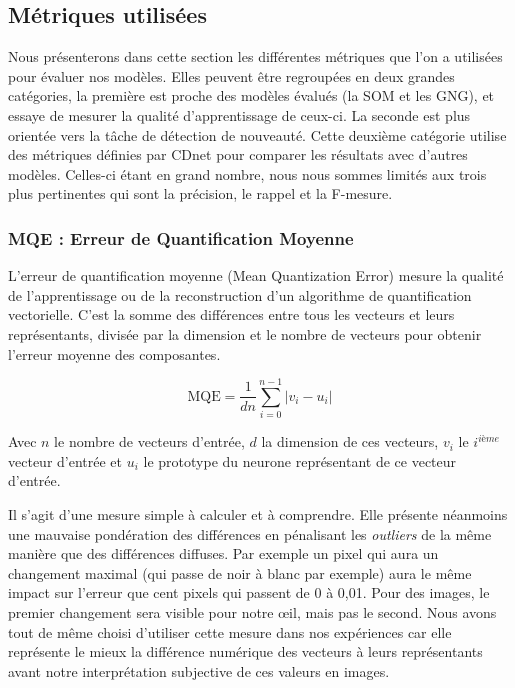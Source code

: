 	\subsection{Métriques utilisées}

	Nous présenterons dans cette section les différentes métriques que l'on a utilisées pour évaluer nos modèles. Elles peuvent être regroupées en deux grandes catégories, la première est proche des modèles évalués (la SOM et les GNG), et essaye de mesurer la qualité d'apprentissage de ceux-ci. La seconde est plus orientée vers la tâche de détection de nouveauté. Cette deuxième catégorie utilise des métriques définies par CDnet pour comparer les résultats avec d'autres modèles. Celles-ci étant en grand nombre, nous nous sommes limités aux trois plus pertinentes qui sont la précision, le rappel et la F-mesure.

	\subsubsection{MQE : Erreur de Quantification Moyenne}

	L'erreur de quantification moyenne (Mean Quantization Error) mesure la qualité de l'apprentissage ou de la reconstruction d'un algorithme de quantification vectorielle. C'est la somme des différences entre tous les vecteurs et leurs représentants, divisée par la dimension et le nombre de vecteurs pour obtenir l'erreur moyenne des composantes.
	
	\begin{equation}
		\text{MQE} = \frac{1}{dn} \sum_{i=0}^{n-1} |v_i - u_i|
	\end{equation}

	Avec $n$ le nombre de vecteurs d'entrée, $d$ la dimension de ces vecteurs, $v_i$ le $i^{\textit{ième}}$ vecteur d'entrée et $u_i$ le prototype du neurone représentant de ce vecteur d'entrée. 

	Il s'agit d'une mesure simple à calculer et à comprendre. Elle présente néanmoins une mauvaise pondération des différences en pénalisant les \textit{outliers} de la même manière que des différences diffuses. Par exemple un pixel qui aura un changement maximal (qui passe de noir à blanc par exemple) aura le même impact sur l'erreur que cent pixels qui passent de 0 à 0,01. Pour des images, le premier changement sera visible pour notre œil, mais pas le second. Nous avons tout de même choisi d'utiliser cette mesure dans nos expériences car elle représente le mieux la différence numérique des vecteurs à leurs représentants avant notre interprétation subjective de ces valeurs en images.

